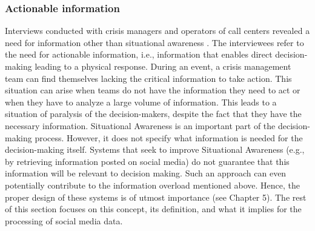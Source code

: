 \subsubsection{Actionable information}
Interviews conducted with crisis managers and operators of call centers revealed a need for information other than situational awareness \parencite{zadeSituationalAwarenessActionability2018, kropczynskiIdentifyingActionableInformation2018}.
The interviewees refer to the need for actionable information, i.e., information that enables direct decision-making leading to a physical response.
During an event, a crisis management team can find themselves lacking the critical information to take action.
This situation can arise when teams do not have the information they need to act or when they have to analyze a large volume of information.
This leads to a situation of paralysis of the decision-makers, despite the fact that they have the necessary information.
Situational Awareness is an important part of the decision-making process.
However, it does not specify what information is needed for the decision-making itself.
Systems that seek to improve Situational Awareness (e.g., by retrieving information posted on social media) do not guarantee that this information will be relevant to decision making.
Such an approach can even potentially contribute to the information overload mentioned above.
Hence, the proper design of these systems is of utmost importance (see Chapter 5).
The rest of this section focuses on this concept, its definition, and what it implies for the processing of social media data.

